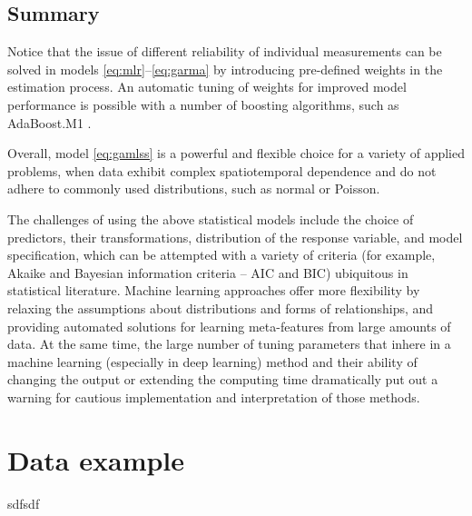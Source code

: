\documentclass[
]{book}
\begin{document}
\hypertarget{summary}{%
\subsection{Summary}\label{summary}}

Notice that the issue of different reliability of individual measurements can be solved in models \eqref{eq:mlr}--\eqref{eq:garma} by introducing pre-defined weights in the estimation process. An automatic tuning of weights for improved model performance is possible with a number of boosting algorithms, such as AdaBoost.M1 \citep{Hastie:etal:2009}.

Overall, model \eqref{eq:gamlss} is a powerful and flexible choice for a variety of applied problems, when data exhibit complex spatiotemporal dependence and do not adhere to commonly used distributions, such as normal or Poisson.

The challenges of using the above statistical models include the choice of predictors, their transformations, distribution of the response variable, and model specification, which can be attempted with a variety of criteria (for example, Akaike and Bayesian information criteria -- AIC and BIC) ubiquitous in statistical literature. Machine learning approaches offer more flexibility by relaxing the assumptions about distributions and forms of relationships, and providing automated solutions for learning meta-features from large amounts of data. At the same time, the large number of tuning parameters that inhere in a machine learning (especially in deep learning) method and their ability of changing the output or extending the computing time dramatically put out a warning for cautious implementation and interpretation of those methods.

\hypertarget{data-example}{%
\section{Data example}\label{data-example}}

sdfsdf

  
\end{document}
